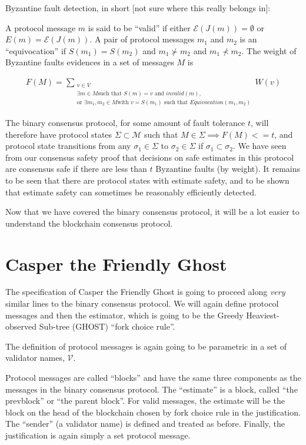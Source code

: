 \documentclass{article}
\theoremstyle{definition}
\begin{document}
Byzantine fault detection, in short [not sure where this really belongs in]:

A protocol message $m$ is said to be ``valid'' if either $\mathcal{E}(J(m)) = \emptyset$ or $E(m) = \mathcal{E}(J(m))$.
A pair of protocol messages $m_1$ and $m_2$ is an ``equivocation'' if $S(m_1) = S(m_2)$ and $m_1 \nsucc m_2$ and $m_1 \nprec m_2$.
The weight of Byzantine faults evidences in a set of messages $M$ is

\begin{align}
F(M) = \sum_{\substack{v \in V \\ \exists m \in M \text{such that } S(m) = v \text{ and } invalid(m), \\ \text{or } \exists m_1, m_2 \in M \text{with $v = S(m_1)$ such that } Equivocation(m_1, m_2)}} W(v)
\end{align}

The binary consensus protocol, for some amount of fault tolerance $t$, will therefore have protocol states $\Sigma \subset \mathcal{M}$ such that $M \in \Sigma \implies F(M) <= t$, and protocol state transitions from any $\sigma_1 \in \Sigma$ to $\sigma_2 \in \Sigma$ if $\sigma_1 \subset \sigma_2$. We have seen from our consensus safety proof that decisions on safe estimates in this protocol are consensus safe if there are less than $t$ Byzantine faults (by weight). It remains to be seen that there are protocol states with estimate safety, and to be shown that estimate safety can sometimes be reasonably efficiently detected.

Now that we have covered the binary consensus protocol, it will be a lot easier to understand the blockchain consensus protocol.

\section{Casper the Friendly Ghost}

The specification of Casper the Friendly Ghost is going to proceed along \emph{very} similar lines to the binary consensus protocol. We will again define protocol messages and then the estimator, which is going to be the Greedy Heaviest-observed Sub-tree (GHOST) ``fork choice rule''.

The definition of protocol messages is again going to be parametric in a set of validator names, $\mathcal{V}$. 

Protocol messages are called ``blocks'' and have the same three components as the messages in the binary consensus protocol. The ``estimate'' is a block, called ``the prevblock'' or ``the parent block''. For valid messages, the estimate will be the block on the head of the blockchain chosen by fork choice rule in the justification. The ``sender'' (a validator name) is defined and treated as before. Finally, the justification is again simply a set protocol message. 
\end{document}
